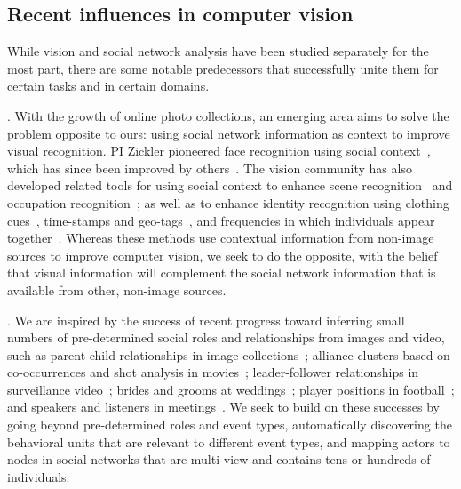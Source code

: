 \subsection{Recent influences in computer vision}

While vision and social network analysis have been studied separately for the most part, there are some notable predecessors that successfully unite them for certain tasks and in certain domains.

. With the growth of online photo collections, an emerging area aims to solve the problem opposite to ours: using social network information as context to improve visual recognition. PI Zickler pioneered face recognition using social context~\cite{Stone2008,Stone2010}, which has since been improved by others~\cite{Dikmen:classify,Poppe2012,LeeBMVC2011,hanalbum2013album}. The vision community has also developed related tools for using social context to enhance scene recognition~\cite{McAuley:socialclassify} and occupation recognition~\cite{occupation2013}; as well as to enhance identity recognition using clothing cues~\cite{anguelov2007cir, zhang2003aah,  song2006cah, sivic2006fpr}, time-stamps and geo-tags~\cite{naaman2005lcr, zhao2006apa}, and frequencies in which individuals appear together~\cite{anguelov2007cir}. Whereas these methods use contextual information from non-image sources to improve computer vision, we seek to do the opposite, with the belief that visual information will complement the social network information that is available from other, non-image sources. 


. We are inspired by the success of recent progress toward inferring small numbers of pre-determined social roles and relationships from images and video, such as parent-child relationships in image collections~\cite{Gallagher,Wang2010,Murillo2012}; alliance clusters based on co-occurrences and shot analysis in movies~\cite{Ding2010,Ding2011}; leader-follower relationships in surveillance video~\cite{Yu2009,Zhang2011}; brides and grooms at weddings~\cite{FeiFeiRole2013}; player positions in football~\cite{LanSM12}; and speakers and listeners in meetings~\cite{meetingrolerecognition}. We seek to build on these successes by going beyond pre-determined roles and event types, automatically discovering the behavioral units that are relevant to different event types, and mapping actors to nodes in social networks that are multi-view and contains tens or hundreds of individuals.

